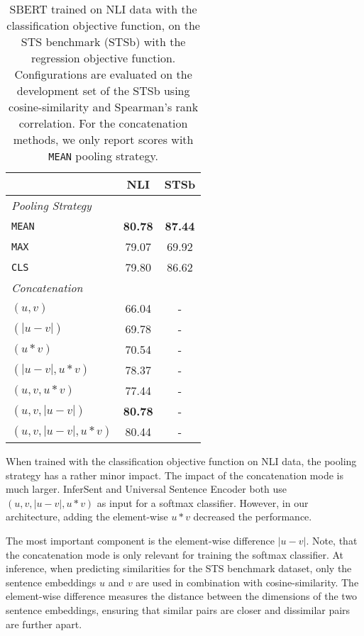 \documentclass[11pt,a4paper]{article}
\begin{document}
\begin{table}[h]
	\centering 
	\footnotesize
	\begin{tabular}{|l|c|c|}
		\hline
		\textbf{} & \textbf{NLI} & \textbf{STSb} \\ \hline
		\multicolumn{3}{|l|}{\textit{Pooling Strategy}} \\ \hline
		\texttt{MEAN} & \textbf{80.78}   & \textbf{87.44} \\
		\texttt{MAX} & 79.07 & 69.92 \\
		\texttt{CLS} & 79.80 & 86.62  \\		
		\hline
		\multicolumn{3}{|l|}{\textit{Concatenation}} \\ \hline
		$(u, v)$ & 66.04 & -\\
		$(|u-v|)$ & 69.78 & - \\
		$(u*v)$ & 70.54 & -\\
		$(|u-v|, u*v)$ & 78.37  & -\\
		$(u, v, u*v)$ & 77.44 & -  \\
		$(u, v, |u-v|)$ &  \textbf{80.78} & - \\
		$(u, v, |u-v|, u*v)$ & 80.44 & - \\ 
		\hline	
	\end{tabular}
	\caption{SBERT trained on NLI data with the classification objective function, on the STS benchmark (STSb) with the regression objective function. Configurations are evaluated on the development set of the STSb using cosine-similarity and Spearman's rank correlation. For the concatenation methods, we only report scores with \texttt{MEAN} pooling strategy. }
	\label{table_ablation_sbert_classfication}
\end{table}



When trained with the classification objective function on NLI data, the pooling strategy has a rather minor impact. The impact of the concatenation mode is much larger. InferSent \cite{conneau2017infersent} and Universal Sentence Encoder \cite{universal_sentence_encoder} both use $(u, v, |u-v|, u*v)$ as input for a softmax classifier. However, in our architecture, adding the element-wise $u*v$ decreased the performance. 

The most important component is the element-wise difference $|u-v|$. Note, that the concatenation mode is only relevant for training the softmax classifier. At inference, when predicting similarities for the STS benchmark dataset, only the sentence embeddings $u$ and $v$ are used in combination with cosine-similarity. The element-wise difference measures the distance between the dimensions of the two sentence embeddings, ensuring that similar pairs are closer and dissimilar pairs are further apart. 
\end{document}
